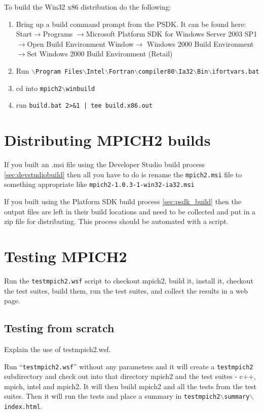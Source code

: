 \documentclass[dvipdfm,11pt]{article}
\begin{document}
To build the Win32 x86 distribution do the following:
\begin{enumerate}
\item Bring up a build command prompt from the PSDK.  It can be found here: Start$\to$Programs
$\to$Microsoft Platform SDK for Windows Server 2003 SP1$\to$Open Build Environment Window$\to$
Windows 2000 Build Environment$\to$Set Windows 2000 Build Environment (Retail)
\item Run \texttt{$\backslash$Program Files$\backslash$Intel$\backslash$Fortran$\backslash$compiler80$\backslash$Ia32$\backslash$Bin$\backslash$ifortvars.bat}
\item cd into \texttt{mpich2$\backslash$winbuild}
\item run \texttt{build.bat 2>\&1 | tee build.x86.out}
\end{enumerate}

\section{Distributing MPICH2 builds}
\label{sec:distribute}

If you built an .msi file using the Developer Studio build process \ref{sec:devstudiobuild} then
all you have to do is rename the \texttt{mpich2.msi} file to something appropriate like
\texttt{mpich2-1.0.3-1-win32-ia32.msi}

If you built using the Platform SDK build process \ref{sec:psdk_build} then the output files
are left in their build locations and need to be collected and put in a zip file for
distributing.  This process should be automated with a script.

\section{Testing MPICH2}
\label{sec:testing}

Run the \texttt{testmpich2.wsf} script to checkout mpich2, build it, install it, checkout 
the test suites, build them, run the test suites, and collect the results in a web page.

\subsection{Testing from scratch}
Explain the use of testmpich2.wsf.

Run ``\texttt{testmpich2.wsf}'' without any parameters and it will create a \texttt{testmpich2}
subdirectory and check out into that directory mpich2 and the test suites - c++, mpich, intel
and mpich2.  It will then build mpich2 and all the tests from the test suites.  Then it will run
the tests and place a summary in \texttt{testmpich2$\backslash$summary$\backslash$index.html}.
\end{document}
